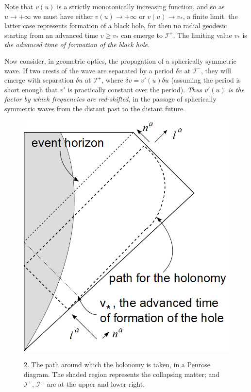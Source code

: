 \documentclass[
%
draft    %
,numberedheadings 
,bibliocites
  ]
  {aipproc}
\newcommand{\scrif}{{{\mathscr I}^{+}}}
\newcommand{\scrip}{{{\mathscr I}^{-}}}
\newcommand{\vv}{{v}}
\begin{document}
Note that $\vv (u)$ is a strictly monotonically increasing function, and so as $u\to +\infty$ we must have either $\vv (u)\to +\infty$ or $\vv (u)\to v_*$, a finite limit.  the latter case represents formation of a black hole, for then no radial geodesic starting from an advanced time $v\geq v_*$ can emerge to $\scrif$.  The limiting value $v_*$ is {\em the advanced time of formation of the black hole.}

Now consider, in geometric optics, the propagation of a spherically symmetric wave.  If two crests of the wave are separated by a period $\delta v$ at $\scrip$, they will emerge with separation $\delta u$ at $\scrif$, where $\delta v=\vv '(u) \delta u$ (assuming the period is short enough that $\vv '$ is practically constant over the period).  {\em Thus $\vv '(u)$ is the factor by which frequencies are red-shifted,} in the passage of spherically symmetric waves from the distant past to the distant future.   

\begin{figure}
\vspace{-2em}
  \begin{flushright}
{\includegraphics[width=.45\textwidth]{HolPath.png}}
\makebox[.45\textwidth]{$\ $ }
\vspace{3em}
\parbox{.45\textwidth}{2.  The path around which the holonomy is taken, in a Penrose diagram.  The shaded region represents the collapsing matter; and $\scrif$, $\scrip$ are at the upper and lower right.}
\end{flushright}
\vspace{-2em}
\label{fig:spherhol}
\end{figure}
\end{document}
